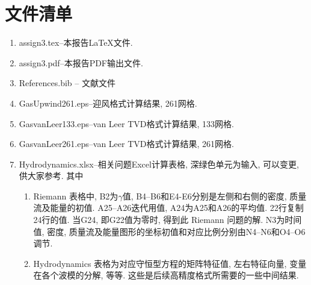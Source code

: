 \documentclass[10.5pt
]{article}
\begin{document}
\section*{文件清单}
\begin{enumerate}
\item
assign3.tex--本报告\LaTeX 文件.
\item
assign3.pdf--本报告PDF输出文件.
\item
References.bib -- 文献文件
\item
GasUpwind261.eps--迎风格式计算结果, 261网格.
\item
GasvanLeer133.eps--van Leer TVD格式计算结果, 133网格.
\item
GasvanLeer261.eps--van Leer TVD格式计算结果, 261网格.
\item
Hydrodynamics.xlsx--相关问题Excel计算表格, 深绿色单元为输入, 可以变更, 供大家参考. 其中
\begin{enumerate}
\item
Riemann 表格中, B2为$\gamma$值, B4--B6和E4-E6分别是左侧和右侧的密度, 质量流及能量的初值. A25--A26迭代用值, A24为A25和A26的平均值. 22行复制24行的值. 当G24, 即G22值为零时, 得到此 Riemann 问题的解. N3为时间值, 密度, 质量流及能量图形的坐标初值和对应比例分别由N4--N6和O4--O6调节.
\item
Hydrodynamics 表格为对应守恒型方程的矩阵特征值, 左右特征向量, 变量在各个波模的分解, 等等. 这些是后续高精度格式所需要的一些中间结果.
\end{enumerate}
\end{enumerate}



\end{document}
